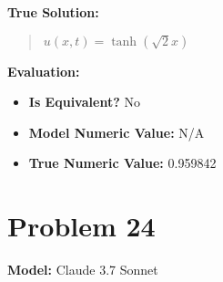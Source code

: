 \documentclass{article}
\begin{document}
\textbf{True Solution:}
\begin{quote}
$u(x,t) = \tanh(\sqrt{2} x)$
\end{quote}

\textbf{Evaluation:}
\begin{itemize}
\item \textbf{Is Equivalent?} No
\item \textbf{Model Numeric Value:} N/A
\item \textbf{True Numeric Value:} 0.959842
\end{itemize}
\vspace{1cm}
\section*{Problem 24}
\textbf{Model:} Claude 3.7 Sonnet
\end{document}
